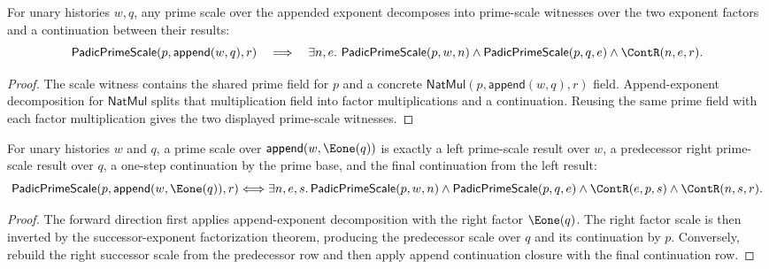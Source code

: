 \begin{theorem}
\label{thm:padic-prime-scale-append-exponent-decomposition}
For unary histories $w,q$, any prime scale over the appended exponent
decomposes into prime-scale witnesses over the two exponent factors and a
continuation between their results:
$$
\mathsf{PadicPrimeScale}(p,\mathsf{append}(w,q),r)
\quad\Longrightarrow\quad
\exists n,e.\ \mathsf{PadicPrimeScale}(p,w,n)\land
\mathsf{PadicPrimeScale}(p,q,e)\land\ContR(n,e,r).
$$
\end{theorem}
\begin{proof}
The scale witness contains the shared prime field for \(p\) and a concrete
\(\mathsf{NatMul}(p,\mathsf{append}(w,q),r)\) field. Append-exponent
decomposition for \(\mathsf{NatMul}\) splits that multiplication field into
factor multiplications and a continuation. Reusing the same prime field with
each factor multiplication gives the two displayed prime-scale witnesses.
\end{proof}

\begin{theorem}
\label{thm:padic-prime-scale-append-succ-right-factorization}
For unary histories $w$ and $q$, a prime scale over
$\mathsf{append}(w,\Eone(q))$ is exactly a left prime-scale result over $w$,
a predecessor right prime-scale result over $q$, a one-step continuation by
the prime base, and the final continuation from the left result:
$$
\mathsf{PadicPrimeScale}(p,\mathsf{append}(w,\Eone(q)),r)
\Longleftrightarrow
\exists n,e,s.\,
\mathsf{PadicPrimeScale}(p,w,n)\land
\mathsf{PadicPrimeScale}(p,q,e)\land
\ContR(e,p,s)\land
\ContR(n,s,r).
$$
\end{theorem}
\begin{proof}
The forward direction first applies append-exponent decomposition with the
right factor $\Eone(q)$. The right factor scale is then inverted by the
successor-exponent factorization theorem, producing the predecessor scale over
$q$ and its continuation by $p$. Conversely, rebuild the right successor scale
from the predecessor row and then apply append continuation closure with the
final continuation row.
\end{proof}

